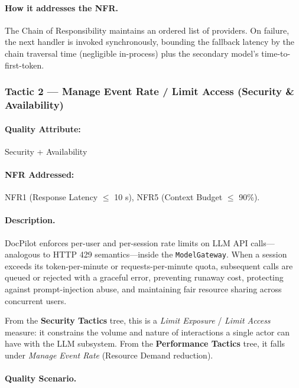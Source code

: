 \documentclass[12pt,a4paper]{article}
\begin{document}
\paragraph{How it addresses the NFR.}
The Chain of Responsibility maintains an ordered list of providers. On failure, the next handler is
invoked synchronously, bounding the fallback latency by the chain traversal time (negligible
in-process) plus the secondary model's time-to-first-token.

\subsubsection{Tactic 2 --- Manage Event Rate / Limit Access (Security \& Availability)}

\paragraph{Quality Attribute:} Security + Availability

\paragraph{NFR Addressed:} NFR1 (Response Latency $\leq$ 10 s), NFR5 (Context Budget $\leq$ 90\%).

\paragraph{Description.}
DocPilot enforces per-user and per-session rate limits on LLM API calls---analogous to HTTP 429
semantics---inside the \texttt{ModelGateway}. When a session exceeds its token-per-minute or
requests-per-minute quota, subsequent calls are queued or rejected with a graceful error,
preventing runaway cost, protecting against prompt-injection abuse, and maintaining fair resource
sharing across concurrent users.

From the \textbf{Security Tactics} tree, this is a \textit{Limit Exposure} / \textit{Limit Access}
measure: it constrains the volume and nature of interactions a single actor can have with the LLM
subsystem. From the \textbf{Performance Tactics} tree, it falls under \textit{Manage Event Rate}
(Resource Demand reduction).

\paragraph{Quality Scenario.}
\end{document}

